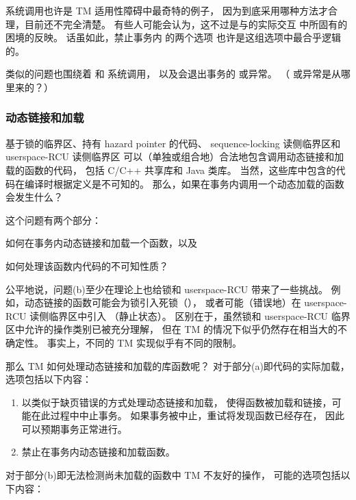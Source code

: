  系统调用也许是 TM 适用性障碍中最奇特的例子，
因为到底采用哪种方法才合理，目前还不完全清楚。
有些人可能会认为，这不过是与的实际交互
中所固有的困境的反映。
话虽如此，禁止事务内  的两个选项
也许是这组选项中最合乎逻辑的。

类似的问题也围绕着  和  系统调用，
以及会退出事务的  或异常。
（ 或异常是从哪里来的？）

\subsubsection{动态链接和加载}
\label{sec:future:Dynamic Linking and Loading}

基于锁的临界区、持有 hazard pointer 的代码、
sequence-locking 读侧临界区和 userspace-RCU 读侧临界区
可以（单独或组合地）合法地包含调用动态链接和加载的函数的代码，
包括 C/C++ 共享库和 Java 类库。
当然，这些库中包含的代码在编译时根据定义是不可知的。
那么，如果在事务内调用一个动态加载的函数会发生什么？

这个问题有两个部分：
\begin{enumerate*}[(a)]
\item 如何在事务内动态链接和加载一个函数，以及
\item 如何处理该函数内代码的不可知性质？
\end{enumerate*}
公平地说，问题(b)至少在理论上也给锁和 userspace-RCU 带来了一些挑战。
例如，动态链接的函数可能会为锁引入死锁（），
或者可能（错误地）在 userspace-RCU 读侧临界区中引入
（静止状态）。
区别在于，虽然锁和 userspace-RCU 临界区中允许的操作类别已被充分理解，
但在 TM 的情况下似乎仍然存在相当大的不确定性。
事实上，不同的 TM 实现似乎有不同的限制。

那么 TM 如何处理动态链接和加载的库函数呢？
对于部分(a)即代码的实际加载，选项包括以下内容：

\begin{enumerate}
\item	以类似于缺页错误的方式处理动态链接和加载，
	使得函数被加载和链接，可能在此过程中中止事务。
	如果事务被中止，重试将发现函数已经存在，
	因此可以预期事务正常进行。
\item	禁止在事务内动态链接和加载函数。
\end{enumerate}

对于部分(b)即无法检测尚未加载的函数中 TM 不友好的操作，
可能的选项包括以下内容：


